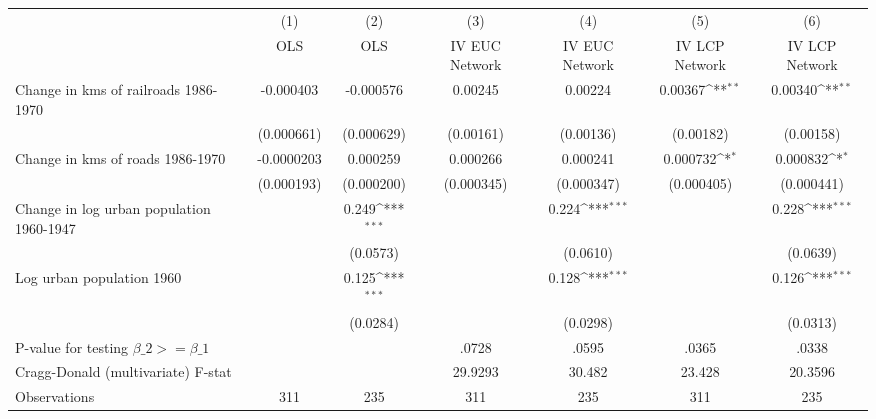 {
\def\sym#1{\ifmmode^{#1}\else\(^{#1}\)\fi}
\begin{tabular}{l*{6}{c}}
\hline\hline
                &\multicolumn{1}{c}{(1)}&\multicolumn{1}{c}{(2)}&\multicolumn{1}{c}{(3)}&\multicolumn{1}{c}{(4)}&\multicolumn{1}{c}{(5)}&\multicolumn{1}{c}{(6)}\\
                &\multicolumn{1}{c}{OLS}&\multicolumn{1}{c}{OLS}&\multicolumn{1}{c}{IV EUC Network}&\multicolumn{1}{c}{IV EUC Network}&\multicolumn{1}{c}{IV LCP Network}&\multicolumn{1}{c}{IV LCP Network}\\
\hline
Change in kms of railroads 1986-1970&-0.000403         &-0.000576         &  0.00245         &  0.00224         &  0.00367\sym{**} &  0.00340\sym{**} \\
                &(0.000661)         &(0.000629)         &(0.00161)         &(0.00136)         &(0.00182)         &(0.00158)         \\
[1em]
Change in kms of roads 1986-1970&-0.0000203         & 0.000259         & 0.000266         & 0.000241         & 0.000732\sym{*}  & 0.000832\sym{*}  \\
                &(0.000193)         &(0.000200)         &(0.000345)         &(0.000347)         &(0.000405)         &(0.000441)         \\
[1em]
Change in log urban population 1960-1947&                  &    0.249\sym{***}&                  &    0.224\sym{***}&                  &    0.228\sym{***}\\
                &                  & (0.0573)         &                  & (0.0610)         &                  & (0.0639)         \\
[1em]
Log urban population 1960&                  &    0.125\sym{***}&                  &    0.128\sym{***}&                  &    0.126\sym{***}\\
                &                  & (0.0284)         &                  & (0.0298)         &                  & (0.0313)         \\
\hline
P-value for testing $\beta\_{2} >= \beta\_{1}$&                  &                  &    .0728         &    .0595         &    .0365         &    .0338         \\
Cragg-Donald (multivariate) F-stat&                  &                  &  29.9293         &   30.482         &   23.428         &  20.3596         \\
Observations    &      311         &      235         &      311         &      235         &      311         &      235         \\
\hline\hline
\end{tabular}
}
